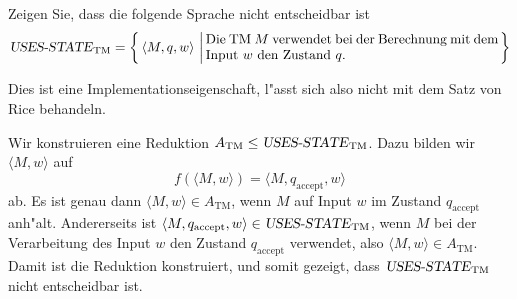Zeigen Sie, dass die folgende  Sprache nicht entscheidbar ist
\[
\text{\textsl{USES-STATE}}_{\text{TM}}=
\left\{
\,
\langle M,q,w\rangle \,\left|\,
\begin{minipage}{3truein}Die TM $M$ verwendet bei der Berechnung mit
dem Input $w$ den Zustand $q$.
\end{minipage}\right.
\right\}
\]

\begin{hinweis}
Dies ist eine Implementationseigenschaft, l"asst sich
also nicht mit dem Satz von Rice behandeln.
\end{hinweis}

\begin{loesung}
Wir konstruieren eine Reduktion
$A_{\text{TM}}\le \text{\textsl{USES-STATE}}_{\text{TM}}$.
Dazu bilden wir
$\langle M,w\rangle$
auf
\[
f(\langle M,w\rangle)=
\langle M,q_{\text{accept}},w\rangle
\]
ab. Es ist genau dann
$\langle M,w\rangle\in A_{\text{TM}}$, wenn $M$ auf Input $w$ im
Zustand $q_{\text{accept}}$ anh"alt.
Andererseits ist
$\langle M,q_{\text{accept}},w\rangle\in 
\text{\textsl{USES-STATE}}_{\text{TM}}$,
wenn $M$ bei der Verarbeitung
des Input $w$ den Zustand $q_{\text{accept}}$ verwendet, also
$\langle M,w\rangle\in A_{\text{TM}}$.
Damit ist die Reduktion konstruiert, und somit gezeigt, dass
$\text{\textsl{USES-STATE}}_{\text{TM}}$ nicht entscheidbar ist.
\end{loesung}
